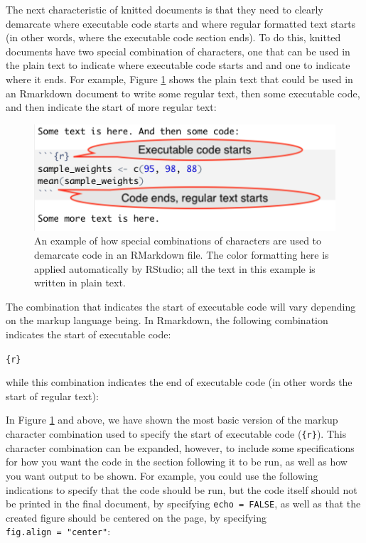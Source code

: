 \documentclass[]{tufte-book}
\begin{document}
The next characteristic of knitted documents is that they need to clearly
demarcate where executable code starts and where regular formatted text starts
(in other words, where the executable code section ends). To do this, knitted
documents have two special combination of characters, one that can be used in
the plain text to indicate where executable code starts and and one to indicate
where it ends. For example, Figure \ref{fig:demarcatecode} shows the plain text
that could be used in an Rmarkdown document to write some regular text, then
some executable code, and then indicate the start of more regular text:

\begin{figure}
\includegraphics[width=\textwidth]{figures/demarcating_code} \caption[An example of how special combinations of characters are used to demarcate code in an RMarkdown file]{An example of how special combinations of characters are used to demarcate code in an RMarkdown file. The color formatting here is applied automatically by RStudio; all the text in this example is written in plain text.}\label{fig:demarcatecode}
\end{figure}

The combination that indicates the start of executable code will vary depending
on the markup language being. In Rmarkdown, the following combination indicates
the start of executable code:

\texttt{\textasciigrave{}\textasciigrave{}\textasciigrave{}\{r\}}

\noindent while this combination indicates the end of executable code (in other
words the start of regular text):

\texttt{\textasciigrave{}\textasciigrave{}\textasciigrave{}}

In Figure \ref{fig:demarcatecode} and above, we have shown the most basic
version of the markup character combination used to specify the start of
executable code (\texttt{\textasciigrave{}\textasciigrave{}\textasciigrave{}\{r\}}). This character combination can be expanded,
however, to include some specifications for how you want the code in the section
following it to be run, as well as how you want output to be shown. For example,
you could use the following indications to specify that the code should be run,
but the code itself should not be printed in the final document, by specifying
\texttt{echo\ =\ FALSE}, as well as that the created figure should be centered on the
page, by specifying \texttt{fig.align\ =\ "center"}:
\end{document}
